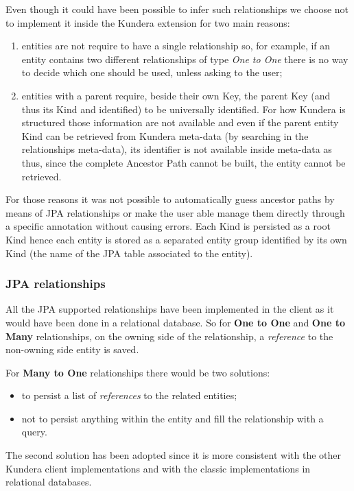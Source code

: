 \noindent Even though it could have been possible to infer such relationships we choose not to implement it inside the Kundera extension for two main reasons: 
\begin{enumerate}
\item entities are not require to have a single relationship so, for example, if an entity contains two different relationships of type \textit{One to One} there is no way to decide which one should be used, unless asking to the user;
\item entities with a parent require, beside their own Key, the parent Key (and thus its Kind and identified) to be universally identified. For how Kundera is structured those information are not available and even if the parent entity Kind can be retrieved from Kundera meta-data (by searching in the relationships meta-data), its identifier is not available inside meta-data as thus, since the complete Ancestor Path cannot be built, the entity cannot be retrieved. 
\end{enumerate}
\noindent For those reasons it was not possible to automatically guess ancestor paths by means of JPA relationships or make the user able manage them directly through a specific annotation without causing errors.
Each Kind is persisted as a root Kind hence each entity is stored as a separated entity group identified by its own Kind (the name of the JPA table associated to the entity).

\subsubsection{JPA relationships}
All the JPA supported relationships have been implemented in the client as it would have been done in a relational database.
So for \textbf{One to One} and \textbf{One to Many} relationships, on the owning side of the relationship, a \textit{reference} to the non-owning side entity is saved.

\noindent For \textbf{Many to One} relationships there would be two solutions:
\begin{itemize}
\item to persist a list of \textit{references} to the related entities;
\item not to persist anything within the entity and fill the relationship with a query.
\end{itemize}
The second solution has been adopted since it is more consistent with the other Kundera client implementations and with the classic implementations in relational databases.

